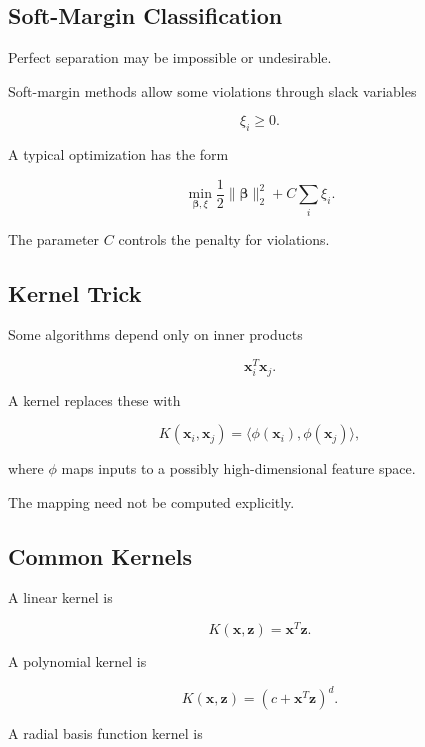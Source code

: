 \subsection{Soft-Margin Classification}
\label{subsec:soft-margin}

Perfect separation may be impossible or undesirable.

Soft-margin methods allow some violations through slack variables

\[
\xi_i\geq0.
\]

A typical optimization has the form

\[
\boxed{
\min_{\boldsymbol{\beta},\xi}
\frac12
\|
\boldsymbol{\beta}
\|_2^2
+
C
\sum_i
\xi_i.
}
\]

The parameter \(C\) controls the penalty for violations.

\subsection{Kernel Trick}
\label{subsec:kernel-trick}

Some algorithms depend only on inner products

\[
\mathbf{x}_i^T
\mathbf{x}_j.
\]

A kernel replaces these with

\[
\boxed{
K
(
\mathbf{x}_i,
\mathbf{x}_j
)
=
\langle
\phi(\mathbf{x}_i),
\phi(\mathbf{x}_j)
\rangle,
}
\]

where \(\phi\) maps inputs to a possibly high-dimensional feature space.

The mapping need not be computed explicitly.

\subsection{Common Kernels}
\label{subsec:common-kernels}

A linear kernel is

\[
\boxed{
K(\mathbf{x},\mathbf{z})
=
\mathbf{x}^T\mathbf{z}.
}
\]

A polynomial kernel is

\[
\boxed{
K(\mathbf{x},\mathbf{z})
=
(
c+\mathbf{x}^T\mathbf{z}
)^d.
}
\]

A radial basis function kernel is

